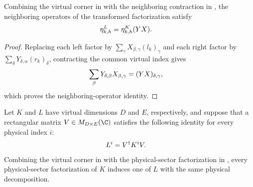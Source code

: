 \begin{lemma}
    \label{thm:mpdo_physical_sector_factorization_virtual_matrices_neighbor}
    \leanok
    Combining the virtual corner in
    \cite[Section~2.3, lines~195--219]{Cirac2016MPDO_arXiv} with the
    neighboring contraction in
    \cite[Appendix~C.2, lines~1441--1450]{Cirac2016MPDO_arXiv}, the neighboring
    operators of the transformed factorization satisfy
    \begin{align}
        \eta^L_{k,h}
         & =\eta^K_{k,h}(YX).
        \notag
    \end{align}
\end{lemma}

\begin{proof}
    \leanok
    Replacing each left factor by
    $\sum_\gamma X_{\beta,\gamma}(l_k)_\gamma$ and each right factor by
    $\sum_\delta Y_{\delta,\alpha}(r_k)_\delta$, contracting the common
    virtual index gives
    \begin{align}
        \sum_\beta Y_{\delta,\beta}X_{\beta,\gamma}
         & =(YX)_{\delta,\gamma},
        \notag
    \end{align}
    which proves the neighboring-operator identity.
\end{proof}

\begin{definition}
    \label{def:mpdo_physical_sector_factorization_virtual_compression}
    \leanok
    Let $K$ and $L$ have virtual dimensions $D$ and $E$, respectively, and
    suppose that a rectangular matrix $V\in M_{D\times E}(\C)$ satisfies the
    following identity for every physical index $i$:
    \begin{align}
        L^i & =V^\dagger K^iV.
        \notag
    \end{align}
    Combining the virtual corner in
    \cite[Section~2.3, lines~195--219]{Cirac2016MPDO_arXiv} with the
    physical-sector factorization in
    \cite[Appendix~C.2, lines~1381--1439]{Cirac2016MPDO_arXiv}, every
    physical-sector factorization of $K$ induces one of $L$ with the same
    physical decomposition.
\end{definition}

